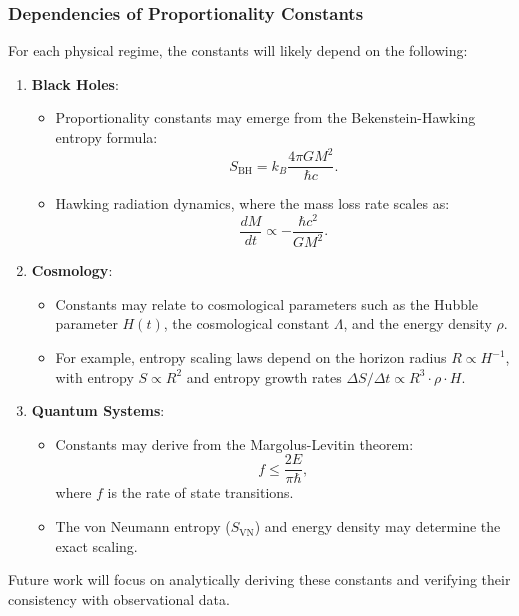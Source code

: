 \documentclass[12pt]{article}
\begin{document}
\subsubsection*{Dependencies of Proportionality Constants}
For each physical regime, the constants will likely depend on the following:
\begin{enumerate}
    \item \textbf{Black Holes}:
    \begin{itemize}
        \item Proportionality constants may emerge from the Bekenstein-Hawking entropy formula:
        \[
        S_{\text{BH}} = k_B \frac{4 \pi G M^2}{\hbar c}.
        \]
        \item Hawking radiation dynamics, where the mass loss rate scales as:
        \[
        \frac{dM}{dt} \propto -\frac{\hbar c^2}{G M^2}.
        \]
    \end{itemize}
    \item \textbf{Cosmology}:
    \begin{itemize}
        \item Constants may relate to cosmological parameters such as the Hubble parameter \( H(t) \), the cosmological constant \( \Lambda \), and the energy density \( \rho \).
        \item For example, entropy scaling laws depend on the horizon radius \( R \propto H^{-1} \), with entropy \( S \propto R^2 \) and entropy growth rates \( \Delta S / \Delta t \propto R^3 \cdot \rho \cdot H \).
    \end{itemize}
    \item \textbf{Quantum Systems}:
    \begin{itemize}
        \item Constants may derive from the Margolus-Levitin theorem:
        \[
        f \leq \frac{2E}{\pi \hbar},
        \]
        where \( f \) is the rate of state transitions.
        \item The von Neumann entropy (\( S_{\text{VN}} \)) and energy density may determine the exact scaling.
    \end{itemize}
\end{enumerate}

Future work will focus on analytically deriving these constants and verifying their consistency with observational data.
\end{document}
